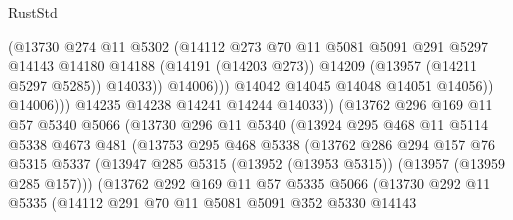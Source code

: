 \begin{lexlean}{RustStd}
\begin{coremodule}
                                (@13730
                                  @274
                                  @11
                                  @5302
                                  (@14112
                                    @273
                                    @70
                                    @11
                                    @5081
                                    @5091
                                    @291
                                    @5297
                                    @14143
                                    @14180
                                    @14188
                                    (@14191 (@14203 @273))
                                    @14209
                                    (@13957 (@14211 @5297 @5285))
                                    @14033))
                                @14006)))
                          @14042
                          @14045
                          @14048
                          @14051
                          @14056))
                      @14006)))
                @14235
                @14238
                @14241
                @14244
                @14033))
            (@13762
              @296
              @169
              @11
              @57
              @5340
              @5066
              (@13730
                @296
                @11
                @5340
                (@13924
                  @295
                  @468
                  @11
                  @5114
                  @5338
                  @4673
                  @481
                  (@13753
                    @295
                    @468
                    @5338
                    (@13762
                      @286
                      @294
                      @157
                      @76
                      @5315
                      @5337
                      (@13947 @285 @5315 (@13952 (@13953 @5315)) (@13957 (@13959 @285 @157)))
                      (@13762
                        @292
                        @169
                        @11
                        @57
                        @5335
                        @5066
                        (@13730
                          @292
                          @11
                          @5335
                          (@14112
                            @291
                            @70
                            @11
                            @5081
                            @5091
                            @352
                            @5330
                            @14143

\end{coremodule}
\end{lexlean}

